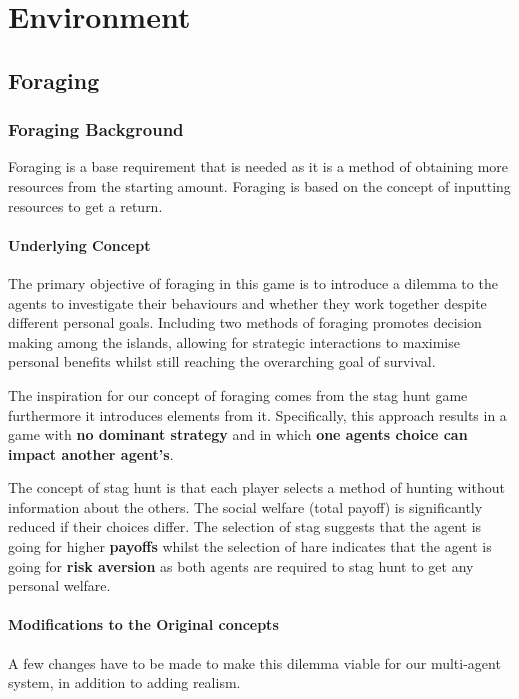 \chapter{Environment}
\section{Foraging}
\subsection{Foraging Background}

Foraging is a base requirement that is needed as it is a method of obtaining more resources from the starting amount. Foraging is based on the concept of inputting resources to get a return.

\subsubsection{Underlying Concept}

The primary objective of foraging in this game is to introduce a dilemma to the agents to investigate their  behaviours and whether they work together despite different personal goals. Including two methods of foraging promotes decision making among the islands, allowing for strategic interactions to maximise personal benefits whilst still reaching the overarching goal of survival. 

The inspiration for our concept of foraging comes from the stag hunt game furthermore it introduces elements from it. Specifically, this approach results in a game with \textbf{no dominant strategy} and in which \textbf{ one agents choice can impact another agent's}.

The concept of stag hunt is that each player selects a method of hunting without information about the others. The social welfare (total payoff) is significantly reduced if their choices differ. The selection of stag suggests that the agent is going for higher \textbf{payoffs} whilst the selection of hare indicates that the agent is going for \textbf{risk aversion} as both agents are required to stag hunt to get any personal welfare.

\subsubsection{Modifications to the Original concepts} 
A few changes have to be made to make this dilemma viable for our multi-agent system, in addition to adding realism. 

